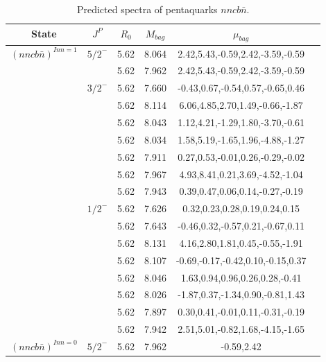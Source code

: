 \documentclass[prd,twocolumn,floatfix,nofootinbib]{revtex4}
\begin{document}
\begin{table*}[!htbp]
    \caption{Predicted spectra of pentaquarks $nncb\bar{n}$.}
    \begin{tabular}{cccccc}
        \hline\hline
        {\rm State} &$J^{P}$ &$R_{0}$ &$M_{bag}$ &$\mu_{bag}$  \\ \hline
        ${(nncb\bar{n})}^{I{nn}=1}$
            &${5/2}^{-}$     &5.62   &8.064 &2.42,5.43,-0.59,2.42,-3.59,-0.59  \\    
                         &$ $     &5.62   &7.962 &2.42,5.43,-0.59,2.42,-3.59,-0.59  \\            
            &${3/2}^{-}$     &5.62   &7.660 &-0.43,0.67,-0.54,0.57,-0.65,0.46    \\
                         &$ $     &5.62   &8.114 &6.06,4.85,2.70,1.49,-0.66,-1.87  \\
                         &$ $     &5.62   &8.043 &1.12,4.21,-1.29,1.80,-3.70,-0.61  \\
                         &$ $     &5.62   &8.034 &1.58,5.19,-1.65,1.96,-4.88,-1.27 \\
                         &$ $     &5.62   &7.911 &0.27,0.53,-0.01,0.26,-0.29,-0.02 \\
                         &$ $     &5.62   &7.967 &4.93,8.41,0.21,3.69,-4.52,-1.04 \\
                         &$ $     &5.62   &7.943 &0.39,0.47,0.06,0.14,-0.27,-0.19  \\
            &${1/2}^{-}$     &5.62   &7.626 &0.32,0.23,0.28,0.19,0.24,0.15  \\
                         &$ $     &5.62   &7.643 &-0.46,0.32,-0.57,0.21,-0.67,0.11  \\
                         &$ $     &5.62   &8.131 &4.16,2.80,1.81,0.45,-0.55,-1.91  \\
                         &$ $     &5.62   &8.107 &-0.69,-0.17,-0.42,0.10,-0.15,0.37 \\
                         &$ $     &5.62   &8.046 &1.63,0.94,0.96,0.26,0.28,-0.41 \\
                         &$ $     &5.62   &8.026 &-1.87,0.37,-1.34,0.90,-0.81,1.43\\
                         &$ $     &5.62   &7.897 &0.30,0.41,-0.01,0.11,-0.31,-0.19\\
                         &$ $     &5.62   &7.942 &2.51,5.01,-0.82,1.68,-4.15,-1.65\\      
            ${(nncb\bar{n})}^{I{nn}=0}$
            &${5/2}^{-}$     &5.62   &7.962 &-0.59,2.42 \\                

\end{tabular}
\end{table*}
\end{document}
